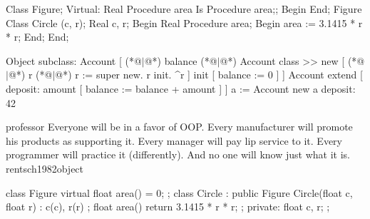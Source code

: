 \documentclass{article}
\begin{document}
\begin{lnSnippet}
Class Figure;
  Virtual: Real Procedure area Is Procedure area;;
Begin
End;
Figure Class Circle (c, r);
  Real c, r;
Begin
  Real Procedure area;
  Begin
    area := 3.1415 * r * r;
  End;
End;
\end{lnSnippet}


\begin{lnSnippet}
Object subclass: Account [
    (*@\(\vert\)@*) balance (*@\(\vert\)@*)
    Account class >> new [
        (*@\(\vert\)@*) r (*@\(\vert\)@*)
        r := super new. r init. ^r
    ]
    init [ balance := 0 ]
]
Account extend [
    deposit: amount [ balance := balance + amount ]
]
a := Account new
a deposit: 42
\end{lnSnippet}

\lnQuote
  {professor}
  {Everyone will be in a favor of OOP. Every manufacturer will promote his products as supporting it. Every manager will pay lip service to it. Every programmer will practice it (differently). And no one will know just what it is.}
  {rentsch1982object}


\begin{lnSnippet}
class Figure {
  virtual float area() = 0;
};
class Circle : public Figure {
  Circle(float c, float r) : c(c), r(r) {};
  float area() { return 3.1415 * r * r; };
private:
  float c, r;
};
\end{lnSnippet}
\end{document}

